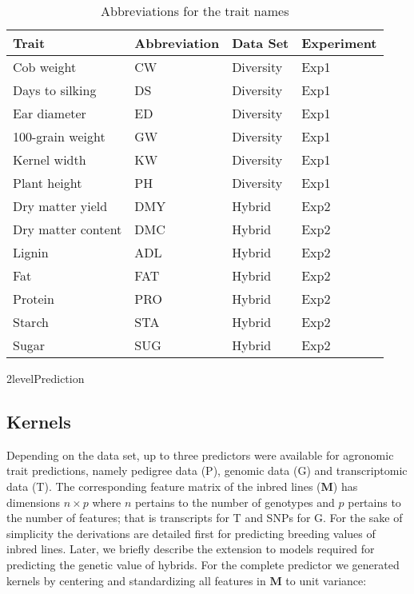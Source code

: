\documentclass[12pt,titlepage]{article}
\begin{document}
\begin{table}[]
\centering
\caption{Abbreviations for the trait names}
\label{table:TraitKey}
\begin{tabular}{@{}llll@{}}
\toprule
Trait              & Abbreviation & Data Set  & Experiment \\ \midrule
Cob weight         & CW           & Diversity & Exp1       \\
Days to silking    & DS           & Diversity & Exp1       \\
Ear diameter       & ED           & Diversity & Exp1       \\
100-grain weight   & GW           & Diversity & Exp1       \\
Kernel width       & KW           & Diversity & Exp1       \\
Plant height       & PH           & Diversity & Exp1       \\
Dry matter yield   & DMY          & Hybrid    & Exp2       \\
Dry matter content & DMC          & Hybrid    & Exp2       \\
Lignin             & ADL          & Hybrid    & Exp2       \\
Fat                & FAT          & Hybrid    & Exp2       \\
Protein            & PRO          & Hybrid    & Exp2       \\
Starch             & STA          & Hybrid    & Exp2       \\
Sugar              & SUG          & Hybrid    & Exp2       \\ \bottomrule
\end{tabular}
\end{table}





\Genetics2level{Prediction}
\subsection{Kernels}
Depending on the data set, up to three predictors were available for agronomic
trait predictions, namely pedigree data (P), genomic data (G) and
transcriptomic data (T).
The corresponding feature matrix of the inbred lines ($\mathbf{M}$) has
dimensions $n \times p$ where $n$ pertains to the number of genotypes and $p$
pertains to the number of features; that is transcripts for T and SNPs for G.
For the sake of simplicity the derivations are detailed first for predicting
breeding values of inbred lines.
Later, we briefly describe the extension to models required for predicting the
genetic value of hybrids.
For the complete predictor we generated kernels by centering and standardizing
all features in $\mathbf{M}$ to unit variance:
\end{document}

